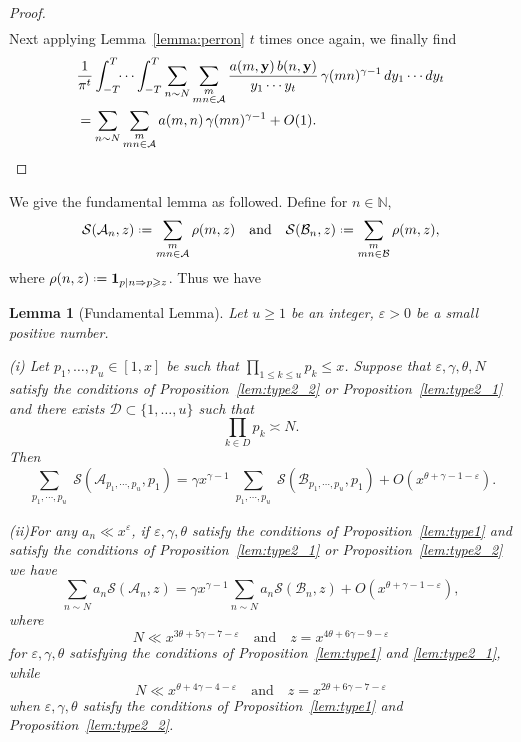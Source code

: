 \documentclass[12pt, reqno, twoside, letterpaper]{amsart}
\numberwithin{equation}{section}
\newcommand{\cA}{\ensuremath{\mathcal{A}}}
\newcommand{\cB}{\ensuremath{\mathcal{B}}}
\newcommand{\cD}{\ensuremath{\mathcal{D}}}
\newcommand{\cS}{\ensuremath{\mathcal{S}}}
\newcommand{\NN}{\ensuremath{\mathbb{N}}}
\theoremstyle{customthm}
\newtheorem{lemma}[X]{Lemma}
\theoremstyle{customrem}
\newcommand*{\defeq}{\mathrel{\vcenter{\baselineskip0.5ex \lineskiplimit0pt
			\hbox{\scriptsize.}\hbox{\scriptsize.}}}%
	=}
\def\int{\intop\nolimits}
\begin{document}
\begin{proof}
\begin{align*}
\end{align*}
Next applying Lemma~\ref{lemma:perron} $t$ times once again, we finally find
\begin{align*}
&\frac{1}{\pi^t} \int_{-T}^{T} \!\!\cdots\ \!\! \int_{-T}^{T} \sum_{n \sim N} \sum_{\substack{m \\ mn \in \cA}}  \frac{a(m, \mathbf{y}) \, b(n, \mathbf{y})}{y_1 \cdots y_t} \, \gamma(mn)^{\gamma-1} \, dy_1 \cdots dy_t \\
&= \sum_{n \sim N} \sum_{\substack{m \\ mn \in \cA}}  a(m, n) \, \gamma(mn)^{\gamma-1} + O(1).
\end{align*}
\end{proof}


We give the fundamental lemma as followed. Define for $n \in \NN$,
$$
\cS(\cA_n,z) \defeq \sum_{\substack{m \\ mn\in\cA}} \rho(m,z) \quad \text{and} \quad \cS(\cB_n,z) \defeq \sum_{\substack{m \\ mn\in\cB}} \rho(m,z), 
$$
where $\rho(n,z) \defeq \textbf{1}_{p|n \Rightarrow p\geqslant z}$. Thus we have
\begin{lemma}[Fundamental Lemma]\label{The Fundamental Lemma}
Let $u \geqslant 1$ be an integer, $\varepsilon > 0$ be a small positive number. 
	
(i) Let $p_1, \ldots, p_u \in [1, x]$ be such that $\prod_{1 \leqslant k \leqslant u} p_k \leqslant x$. Suppose that $\varepsilon, \gamma, \theta, N$ satisfy the conditions of Proposition~\ref{lem:type2_2} or Proposition~\ref{lem:type2_1} and there exists $\cD \subset \{1, \ldots, u\}$ such that  
$$\prod_{k \in D} p_k \asymp N.$$
Then  
\begin{equation}\label{fundamental lemma 1}
\sum_{\substack{ p_1 , \cdots , p_u  }} \cS(\cA_{p_1, \cdots, p_u}, p_1) = \gamma x^{\gamma-1} \sum_{\substack{p_1 , \cdots , p_u }} \cS(\cB_{p_1, \cdots, p_u}, p_1) + O(x^{\theta + \gamma - 1 - \varepsilon}).
\end{equation}

(ii)For any $a_n \ll x^{\varepsilon}$, if $\varepsilon, \gamma, \theta$ satisfy the conditions of Proposition~\ref{lem:type1} and satisfy the conditions of Proposition~\ref{lem:type2_1} or Proposition~\ref{lem:type2_2} we have
\begin{equation}\label{fundamental lemma 2}
\sum_{n \sim N} a_n \cS(\cA_n, z) = \gamma x^{\gamma-1} \sum_{n \sim N} a_n \cS(\cB_n, z) + O(x^{\theta + \gamma - 1 - \varepsilon} ),
\end{equation}
where 
$$
N \ll x^{3\theta + 5\gamma -7 -\varepsilon} \quad \text{and} \quad z = x^{4\theta+6\gamma-9-\varepsilon}
$$ 
for $\varepsilon, \gamma, \theta$ satisfying the conditions of Proposition~\ref{lem:type1} and \ref{lem:type2_1}, while 
$$
N \ll x^{\theta + 4\gamma -4-\varepsilon} \quad \text{and} \quad z = x^{2\theta+6\gamma-7-\varepsilon}
$$ 
when $\varepsilon, \gamma, \theta$ satisfy the conditions of Proposition~\ref{lem:type1} and Proposition~\ref{lem:type2_2}.
\end{lemma}
\end{document}
